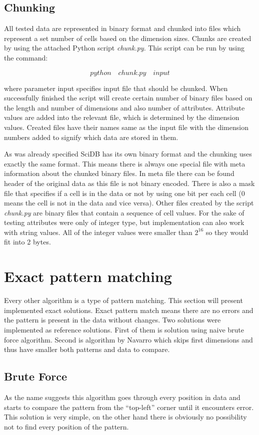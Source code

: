 \subsection{Chunking}
All tested data are represented in binary format and chunked into files which represent a set number of cells based on the dimension sizes. Chunks are created by using the attached Python script \textit{chunk.py}. This script can be run by using the command:

$$python\quad chunk.py\quad input$$

where parameter input specifies input file that should be chunked. When successfully finished the script will create certain number of binary files based on the length and number of dimensions and also number of attributes.
Attribute values are added into the relevant file, which is determined by the dimension values. Created files have their names same as the input file with the dimension numbers added to signify which data are stored in them.

As was already specified SciDB has its own binary format and the chunking uses exactly the same format. This means there is always one special file with meta information about the chunked binary files. In meta file there can be found header of the original data as this file is not binary encoded. There is also a mask file that specifies if a cell is in the data or not by using one bit per each cell (0 means the cell is not in the data and vice versa). Other files created by the script \textit{chunk.py} are binary files that contain a sequence of cell values. For the sake of testing attributes were only of integer type, but implementation can also work with string values. All of the integer values were smaller than $2^{16}$ so they would fit into 2 bytes.

\section{Exact pattern matching}
Every other algorithm is a type of pattern matching. This section will present implemented exact solutions. Exact pattern match means there are no errors and the pattern is present in the data without changes. Two solutions were implemented as reference solutions. First of them is solution using naive brute force algorithm. Second is algorithm by Navarro which skips first dimensions and thus have smaller both patterns and data to compare.

\subsection{Brute Force}
As the name suggests this algorithm goes through every position in data and starts to compare the pattern from the ``top-left'' corner until it encounters error. This solution is very simple, on the other hand there is obviously no possibility not to find every position of the pattern.

